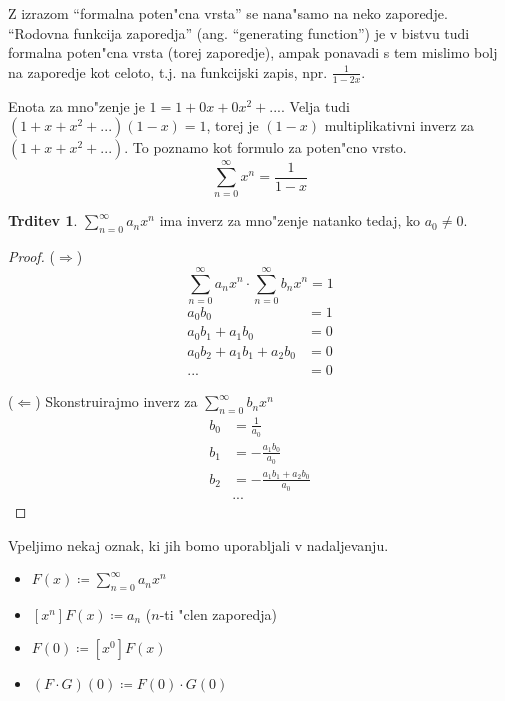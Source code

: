 \documentclass[a4paper,12pt]{article}
\theoremstyle{definition}
\newtheorem{claim}[counter]{Trditev}
\theoremstyle{remark}
\newcommand{\R}{\mathbb{R}}
\begin{document}
Z izrazom ``formalna poten"cna vrsta'' se nana"samo na neko zaporedje. ``Rodovna funkcija zaporedja'' (ang. ``generating function'') je v bistvu tudi formalna poten"cna vrsta (torej zaporedje), ampak ponavadi s tem mislimo bolj na zaporedje kot celoto, t.j. na funkcijski zapis, npr. $\frac{1}{1-2x}$.

Enota za mno"zenje je $1 = 1 + 0 x + 0 x^2 + ...$. Velja tudi $(1 + x + x^2 + ...) (1 - x) = 1$, torej je $(1 - x)$ multiplikativni inverz za $(1 + x + x^2 + ...)$. To poznamo kot formulo za poten"cno vrsto.
\[\sum_{n = 0}^{\infty} x^n = \frac{1}{1 - x}\]

\begin{claim}
    $\sum_{n = 0}^{\infty} a_n x^n$ ima inverz za mno"zenje natanko tedaj, ko $a_0 \neq 0$.
\end{claim}

\begin{proof}
    ($\Rightarrow$)
    \[\sum_{n = 0}^{\infty} a_n x^n \cdot \sum_{n = 0}^{\infty} b_n x^n = 1\]
    \begin{align*}
        a_0 b_0 &= 1\\
        a_0 b_1 + a_1 b_0 &= 0\\
        a_0 b_2 + a_1 b_1 + a_2 b_0 &= 0\\
        ... &= 0
    \end{align*}

    ($\Leftarrow$)
    Skonstruirajmo inverz za $\sum_{n = 0}^{\infty} b_n x^n$
    \begin{align*}
        b_0 &= \frac{1}{a_0}\\
        b_1 &= -\frac{a_1 b_0}{a_0}\\
        b_2 &= - \frac{a_1 b_1 + a_2 b_0}{a_0}\\
        &...
    \end{align*}
\end{proof}

Vpeljimo nekaj oznak, ki jih bomo uporabljali v nadaljevanju.
\begin{itemize}
    \item[] $F(x) \coloneqq \sum_{n = 0}^{\infty} a_n x^n$
    \item[] $[x^n]F(x) \coloneqq a_n$ ($n$-ti "clen zaporedja)
    \item[] $F(0) \coloneqq [x^0]F(x)$
    \item[] $(F \cdot G)(0) \coloneqq F(0) \cdot G(0)$
\end{itemize}
\end{document}
